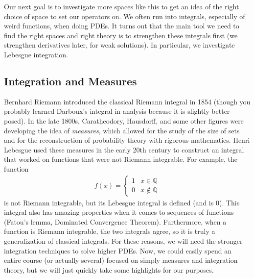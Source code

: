 \documentclass{article}
\newcommand{\Q}{{\mathbb{Q}}}
\begin{document}
	\vspace{ 0.25 cm}
	
	Our next goal is to investigate more spaces like this to get an idea of the right choice of space to set our operators on. We often run into integrals, especially of weird functions, when doing PDEs. It turns out that the main tool we need to find the right spaces and right theory is to strengthen these integrals first (we strengthen derivatives later, for weak solutions). In particular, we investigate Lebesgue integration. 
	
	
	\subsection{Integration and Measures}
	
	Bernhard Riemann introduced the classical Riemann integral in 1854 (though you probably learned Darboux's integral in analysis because it is slightly better-posed). In the late 1800s, Caratheodory, Hausdorff, and some other figures were developing the idea of \textit{measures}, which allowed for the study of the size of sets and for the reconstruction of probability theory with rigorous mathematics. Henri Lebesgue used these measures in the early 20th century to construct an integral that worked on functions that were not Riemann integrable. For example, the function 
	\begin{align*}
		f(x) = \begin{cases}
			1 & x \in \Q \\
			0 & x \notin \Q
		\end{cases}
	\end{align*}
	is not Riemann integrable, but its Lebesgue integral is defined (and is 0). This integral also has amazing properties when it comes to sequences of functions (Fatou's lemma, Dominated Convergence Theorem). Furthermore, when a function is Riemann integrable, the two integrals agree, so it is truly a generalization of classical integrals. For these reasons, we will need the stronger integration techniques to solve higher PDEs. Now, we could easily spend an entire course (or actually several) focused on simply measures and integration theory, but we will just quickly take some highlights for our purposes. 
	
\end{document}
